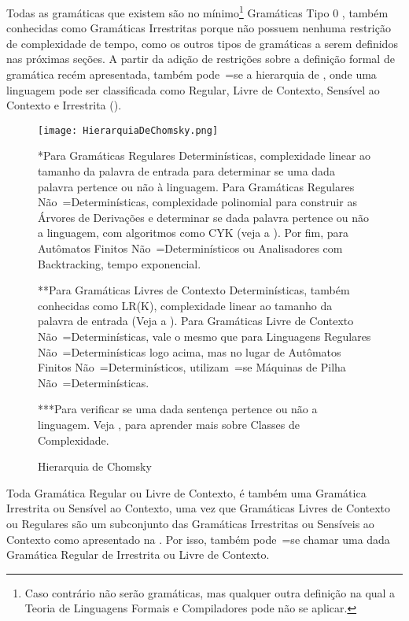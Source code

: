 Todas as gramáticas que existem são no mínimo\footnote{
Caso contrário não serão gramáticas,
mas qualquer outra definição na qual a Teoria de Linguagens Formais e
Compiladores pode não se aplicar.
}
Gramáticas Tipo 0 \cite{ahoTheoryOfParsing,chomskyGrammars1956},
também conhecidas como Gramáticas Irrestritas porque não possuem nenhuma restrição de complexidade de tempo,
como os outros tipos de gramáticas a serem definidos nas próximas seções{}.
A partir da adição de restrições sobre a definição formal de gramática recém apresentada,
também pode~=se  a hierarquia de ,
onde uma linguagem pode ser classificada como Regular,
Livre de Contexto,
Sensível ao Contexto e
Irrestrita ().
\begin{figure}[!htb]
\caption{Hierarquia de Chomsky}
\label{FigureHierarquiaDeChomsky}
\centering
\texttt{[image: HierarquiaDeChomsky.png]}
\begin{minipage}{\textwidth} \footnotesize
*Para Gramáticas Regulares Determinísticas,
complexidade linear ao tamanho da palavra de entrada para determinar se uma dada palavra pertence ou
não à linguagem.
Para Gramáticas Regulares Não~=Determinísticas,
complexidade polinomial para construir as Árvores de Derivações e
determinar se dada palavra pertence ou
não a linguagem,
com algoritmos como CYK (veja a ).
Por fim,
para Autômatos Finitos Não~=Determinísticos ou
Analisadores com Backtracking,
tempo exponencial.

**Para Gramáticas Livres de Contexto Determinísticas,
também conhecidas como LR(K),
complexidade linear ao tamanho da palavra de entrada (Veja a ).
Para Gramáticas Livre de Contexto Não~=Determinísticas,
vale o mesmo que para Linguagens Regulares Não~=Determinísticas logo acima,
mas no lugar de Autômatos Finitos Não~=Determinísticos,
utilizam~=se Máquinas de Pilha Não~=Determinísticas.

***Para verificar se uma dada sentença pertence ou
não a linguagem.
Veja ,
para aprender mais sobre Classes de Complexidade.
\end{minipage}
\end{figure}

Toda Gramática Regular ou
Livre de Contexto,
é também uma Gramática Irrestrita ou
Sensível ao Contexto,
uma vez que Gramáticas Livres de Contexto ou
Regulares são um subconjunto das Gramáticas Irrestritas ou
Sensíveis ao Contexto como apresentado na .
Por isso,
também pode~=se chamar uma dada Gramática Regular de Irrestrita ou
Livre de Contexto.

